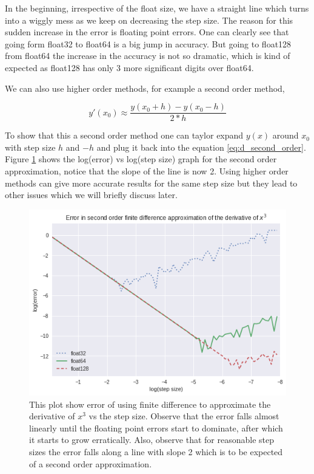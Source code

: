 In the beginning, irrespective of the float size, we have a straight line which turns into a wiggly mess as we keep on decreasing the step size. The reason for this sudden increase in the error is floating point errors. One can clearly see that going form float32 to float64 is a big jump in accuracy. But going to float128 from float64 the increase in the accuracy is not so dramatic, which is kind of expected as float128 has only 3 more significant digits over float64.

We can also use higher order methods, for example a second order method,

\begin{equation}
    y'(x_0)  \approx \frac{y(x_0 + h) - y(x_0 - h)}{2*h}
    \label{eq:d_second_order}
\end{equation}

To show that this a second order method one can taylor expand $y(x)$ around $x_0$ with step size $h$ and $-h$ and plug it back into the equation \ref{eq:d_second_order}. Figure \ref{fig:x^3_error_order2} shows the log(error) vs log(step size) graph for the second order approximation, notice that the slope of the line is now 2. Using higher order methods can give more accurate results for the same step size but they lead to other issues which we will briefly discuss later.

\begin{figure}[hbt!]
    \centering
    \includegraphics[width=\textwidth]{images/x^3_error_order2.png}
    \caption{This plot show error of using finite difference to approximate the derivative of $x^3$ vs the step size. Observe that the error falls almost linearly until the floating point errors start to dominate, after which it starts to grow erratically. Also, observe that for reasonable step sizes the error falls along a line with slope 2 which is to be expected of a second order approximation. }\label{fig:x^3_error_order2}
\end{figure}


